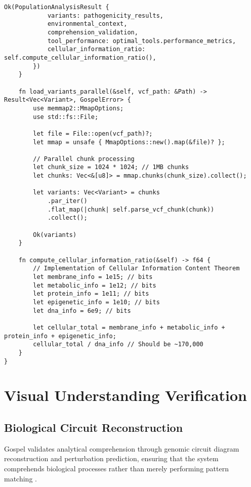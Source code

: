 \documentclass[12pt,a4paper]{article}
\begin{document}
\begin{lstlisting}[style=ruststyle, caption=High-Performance Genomic Processing Core]
        Ok(PopulationAnalysisResult {
            variants: pathogenicity_results,
            environmental_context,
            comprehension_validation,
            tool_performance: optimal_tools.performance_metrics,
            cellular_information_ratio: self.compute_cellular_information_ratio(),
        })
    }
    
    fn load_variants_parallel(&self, vcf_path: &Path) -> Result<Vec<Variant>, GospelError> {
        use memmap2::MmapOptions;
        use std::fs::File;
        
        let file = File::open(vcf_path)?;
        let mmap = unsafe { MmapOptions::new().map(&file)? };
        
        // Parallel chunk processing
        let chunk_size = 1024 * 1024; // 1MB chunks
        let chunks: Vec<&[u8]> = mmap.chunks(chunk_size).collect();
        
        let variants: Vec<Variant> = chunks
            .par_iter()
            .flat_map(|chunk| self.parse_vcf_chunk(chunk))
            .collect();
        
        Ok(variants)
    }
    
    fn compute_cellular_information_ratio(&self) -> f64 {
        // Implementation of Cellular Information Content Theorem
        let membrane_info = 1e15; // bits
        let metabolic_info = 1e12; // bits  
        let protein_info = 1e11; // bits
        let epigenetic_info = 1e10; // bits
        let dna_info = 6e9; // bits
        
        let cellular_total = membrane_info + metabolic_info + protein_info + epigenetic_info;
        cellular_total / dna_info // Should be ~170,000
    }
}
\end{lstlisting}

\section{Visual Understanding Verification}

\subsection{Biological Circuit Reconstruction}

Gospel validates analytical comprehension through genomic circuit diagram reconstruction and perturbation prediction, ensuring that the system comprehends biological processes rather than merely performing pattern matching \cite{hopfield1982neural, bennett2003notes}.
\end{document}
